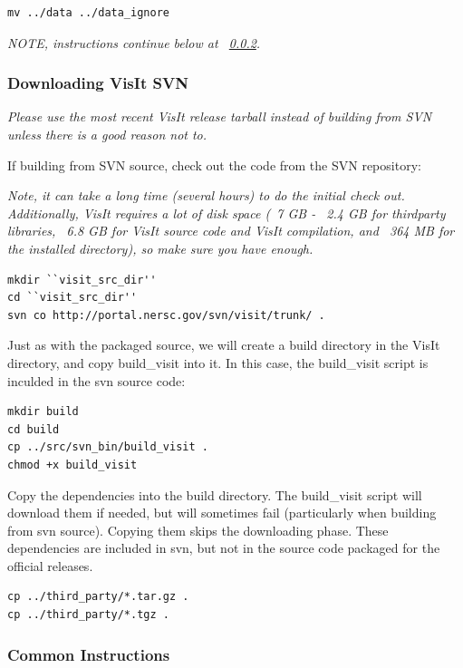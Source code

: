 \documentclass[12pt]{article}
\begin{document}
\begin{verbatim}
mv ../data ../data_ignore
\end{verbatim}

\emph{NOTE, instructions continue below at ~\ref{subsec:VisItVersion2_common}.}

\subsubsection{Downloading VisIt SVN}
\label{subsec:VisItVersion2_svn}

\emph{Please use the most recent VisIt release tarball instead of
  building from SVN unless there is a good reason not to.}

If building from SVN source, check out the code from the SVN repository:

\emph{Note, it can take a long time (several hours) to do the initial
  check out.  Additionally, VisIt requires a lot of disk space (~7 GB
  - ~2.4 GB for thirdparty libraries, ~6.8 GB for VisIt source code
  and VisIt compilation, and ~364 MB for the installed directory),
  so make sure you have enough. }


\begin{verbatim}
mkdir ``visit_src_dir''
cd ``visit_src_dir'' 
svn co http://portal.nersc.gov/svn/visit/trunk/ .
\end{verbatim}

Just as with the packaged source, we will create a build directory in 
the VisIt directory, and copy build\_visit into it.  In this case,
the build\_visit script is inculded in the svn source code:

\begin{verbatim}
mkdir build
cd build
cp ../src/svn_bin/build_visit .
chmod +x build_visit
\end{verbatim}

Copy the dependencies into the build directory. The build\_visit script
will download them if needed, but will sometimes fail (particularly when
building from svn source).  Copying them
skips the downloading phase.  These dependencies are included in svn, but
not in the source code packaged for the official releases.

\begin{verbatim}
cp ../third_party/*.tar.gz .
cp ../third_party/*.tgz .
\end{verbatim}

\subsubsection{Common Instructions}
\label{subsec:VisItVersion2_common}
\end{document}
